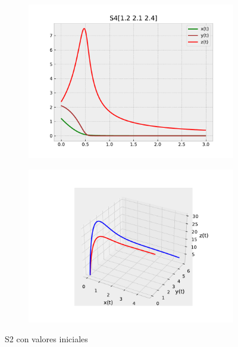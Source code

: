 \documentclass{wscpaperproc}
\theoremstyle{wsc}
\begin{document}
\begin{figure}[h]
	\centering
	\begin{subfigure}[b]{0.5\textwidth}
		\centering
		\includegraphics[width=\textwidth]{Simulations/S4[1.2 2.1 2.4].pdf}
	
		\label{fig:comparativa81}
	\end{subfigure}%
	\begin{subfigure}[b]{0.5\textwidth}
		\centering
		\includegraphics[width=\textwidth]{Simulations/S13d.pdf}
		\label{fig:comparativa82}
	\end{subfigure}
	\caption{S2 con valores iniciales}

	\label{fig:comparacion11}
\end{figure}
\end{document}
